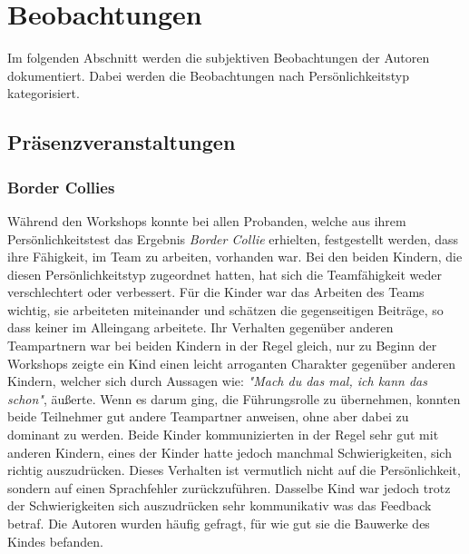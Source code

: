 \chapter{Beobachtungen}
Im folgenden Abschnitt werden die subjektiven Beobachtungen der Autoren dokumentiert. Dabei werden die Beobachtungen nach Persönlichkeitstyp kategorisiert.
\section{Präsenzveranstaltungen}
\subsection{Border Collies}
Während den Workshops konnte bei allen Probanden, welche aus ihrem Persönlichkeitstest das Ergebnis \textit{Border Collie} erhielten, festgestellt werden, dass ihre Fähigkeit, im Team zu arbeiten, vorhanden war. Bei den beiden Kindern, die diesen Persönlichkeitstyp zugeordnet hatten, hat sich die Teamfähigkeit weder verschlechtert oder verbessert. Für die Kinder war das Arbeiten des Teams wichtig, sie arbeiteten miteinander und schätzen die gegenseitigen Beiträge, so dass keiner im Alleingang arbeitete. Ihr Verhalten gegenüber anderen Teampartnern war bei beiden Kindern in der Regel gleich, nur zu Beginn der Workshops zeigte ein Kind einen leicht arroganten Charakter gegenüber anderen Kindern, welcher sich durch Aussagen wie: \textit{"Mach du das mal, ich kann das schon"}, äußerte. Wenn es darum ging, die Führungsrolle zu übernehmen, konnten beide Teilnehmer gut andere Teampartner anweisen, ohne aber dabei zu dominant zu werden. Beide Kinder kommunizierten in der Regel sehr gut mit anderen Kindern, eines der Kinder hatte jedoch manchmal Schwierigkeiten, sich richtig auszudrücken. Dieses Verhalten ist vermutlich nicht auf die Persönlichkeit, sondern auf einen Sprachfehler zurückzuführen. Dasselbe Kind war jedoch trotz der Schwierigkeiten sich auszudrücken sehr kommunikativ was das Feedback betraf. Die Autoren wurden häufig gefragt, für wie gut sie die Bauwerke des Kindes befanden.



